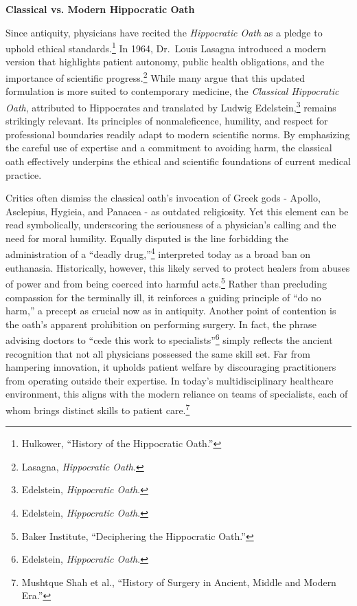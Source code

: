 \documentclass[12pt]{article}
\begin{document}
\begin{center}
\Large \textbf{Classical vs. Modern Hippocratic Oath}
\end{center}

Since antiquity, physicians have recited the \textit{Hippocratic Oath} as a pledge to uphold ethical standards.\footnote{Hulkower, ``History of the Hippocratic Oath.''} 
In 1964, Dr.\ Louis Lasagna introduced a modern version that highlights patient autonomy, public health obligations, 
and the importance of scientific progress.\footnote{Lasagna, \textit{Hippocratic Oath}.} 
While many argue that this updated formulation is more suited to contemporary medicine, 
the \textit{Classical Hippocratic Oath}, attributed to Hippocrates and translated by Ludwig Edelstein,\footnote{Edelstein, \textit{Hippocratic Oath}.} 
remains strikingly relevant. Its principles of nonmaleficence, humility, and respect for professional boundaries
readily adapt to modern scientific norms. By emphasizing the careful use of expertise and a commitment to avoiding harm, 
the classical oath effectively underpins the ethical and scientific foundations of current medical practice.

\bigskip

Critics often dismiss the classical oath’s invocation of Greek gods - Apollo, Asclepius, Hygieia, and Panacea - as outdated religiosity. 
Yet this element can be read symbolically, underscoring the seriousness of a physician’s calling and the need for moral humility. 
Equally disputed is the line forbidding the administration of a ``deadly drug,''\footnote{Edelstein, \textit{Hippocratic Oath}.} 
interpreted today as a broad ban on euthanasia. Historically, however, this likely served to protect healers from abuses of power 
and from being coerced into harmful acts.\footnote{Baker Institute, ``Deciphering the Hippocratic Oath.''} 
Rather than precluding compassion for the terminally ill, it reinforces a guiding principle of ``do no harm,'' 
a precept as crucial now as in antiquity. Another point of contention is the oath’s apparent prohibition on performing surgery. 
In fact, the phrase advising doctors to ``cede this work to specialists''\footnote{Edelstein, \textit{Hippocratic Oath}.} 
simply reflects the ancient recognition that not all physicians possessed the same skill set. 
Far from hampering innovation, it upholds patient welfare by discouraging practitioners from operating outside their expertise. 
In today’s multidisciplinary healthcare environment, this aligns with the modern reliance on teams of specialists, 
each of whom brings distinct skills to patient care.\footnote{Mushtque Shah et al., ``History of Surgery in Ancient, Middle and Modern Era.''}
\end{document}
